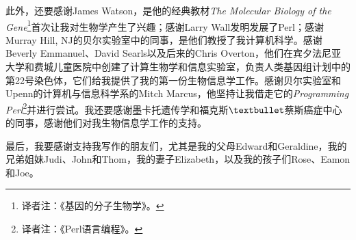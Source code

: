 此外，还要感谢James Watson，是他的经典教材\textit{The Molecular Biology of the Gene}\footnote{译者注：《基因的分子生物学》。}首次让我对生物学产生了兴趣；感谢Larry Wall发明发展了Perl；感谢Murray Hill, NJ的贝尔实验室中的同事，是他们教授了我计算机科学。感谢Beverly Emmanuel、David Searls以及后来的Chris Overton，他们在宾夕法尼亚大学和费城儿童医院中创建了计算生物学和信息实验室，负责人类基因组计划中的第22号染色体，它们给我提供了我的第一份生物信息学工作。感谢贝尔实验室和Upenn的计算机与信息科学系的Mitch Marcus，他坚持让我借走它的\textit{Programming Perl}\footnote{译者注：《Perl语言编程》。}并进行尝试。我还要感谢墨卡托遗传学和福克斯$\textbullet$蔡斯癌症中心的同事，感谢他们对我生物信息学工作的支持。 

最后，我要感谢支持我写作的朋友们，尤其是我的父母Edward和Geraldine，我的兄弟姐妹Judi、John和Thom，我的妻子Elizabeth，以及我的孩子们Rose、Eamon和Joe。
